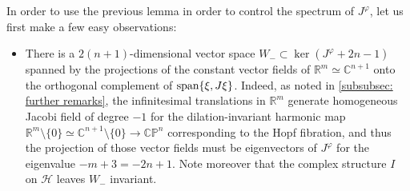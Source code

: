 \documentclass{article}
\numberwithin{equation}{section}        %
\theoremstyle{bfnote}
\theoremstyle{definition}
\theoremstyle{bfremark}
\newcommand{\R}{\mathbb{R}}                 %
\newcommand{\C}{\mathbb{C}}                 %
\renewcommand{\P}{\mathbb{P}}               %
\begin{document}
In order to use the previous lemma in order to control the spectrum of $J^\varphi$, let us first make a few easy observations:
\begin{itemize}
    \item There is a $2(n+1)$-dimensional vector space $W_- \subset \ker(J^\varphi + 2n-1)$ spanned by the projections of the constant vector fields of $\R^m \simeq \C^{n+1}$ onto the orthogonal complement of $\textup{span}\{\xi,J\xi\}$. Indeed, as noted in \cref{subsubsec: further remarks}, the infinitesimal translations in $\R^m$ generate homogeneous Jacobi field of degree $-1$ for the dilation-invariant harmonic map $\R^m \setminus \{0\} \simeq \C^{n+1} \setminus \{0\} \to \C\P^{n}$ corresponding to the Hopf fibration, and thus the projection of those vector fields must be eigenvectors of $J^\varphi$ for the eigenvalue $-m+3 = -2n+1$. Note moreover that the complex structure $I$ on $\mathscr H$ leaves $W_-$ invariant.


\end{itemize}
\end{document}
